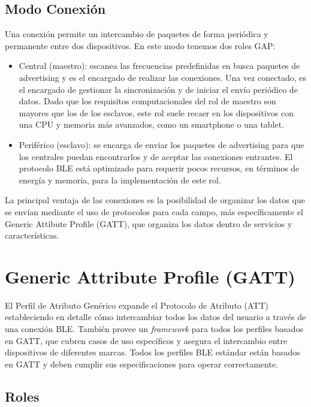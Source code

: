 \subsection{Modo Conexión}
\label{makereference2.3.2}

Una conexión permite un intercambio de paquetes de forma periódica y permanente entre dos dispositivos. En este modo tenemos dos roles GAP:

\begin{itemize}
	\item Central (maestro): escanea las frecuencias predefinidas en busca paquetes de advertising y es el encargado de realizar las conexiones. Una vez conectado, es el encargado de gestionar la sincronización y de iniciar el envío periódico de datos. Dado que los requisitos computacionales del rol de maestro son mayores que los de los esclavos, este rol suele recaer en los dispositivos con una CPU y memoria más avanzados, como un smartphone o una tablet.

	\item Periférico (esclavo): se encarga de enviar los paquetes de advertising para que los centrales puedan encontrarlos y de aceptar las conexiones entrantes. El protocolo BLE está optimizado para requerir pocos recursos, en términos de energía y memoria, para la implementación de este rol.
\end{itemize}

La principal ventaja de las conexiones es la posibilidad de organizar los datos que se envían mediante el uso de protocolos para cada campo, más específicamente el Generic Attibute Profile (GATT), que organiza los datos dentro de servicios y características.

\section{Generic Attribute Profile (GATT)}
\label{makereference2.4}

El Perfil de Atributo Genérico expande el Protocolo de Atributo (ATT) estableciendo en detalle cómo intercambiar todos los datos del usuario a través de una conexión BLE. También provee un \textit{framework} para todos los perfiles basados en GATT, que cubren casos de uso específicos y asegura el intercambio entre dispositivos de diferentes marcas. Todos los perfiles BLE estándar están basados en GATT y deben cumplir sus especificaciones para operar correctamente.

\subsection{Roles}
\label{makereference2.4.1}


